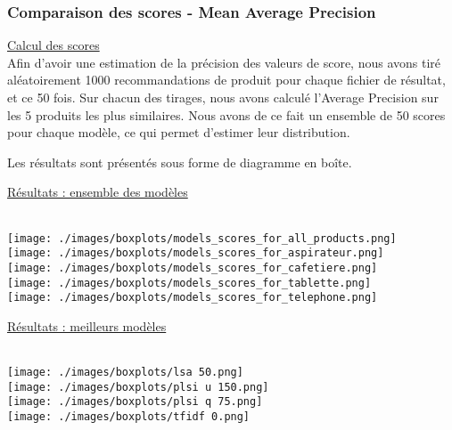 

\subsubsection{Comparaison des scores - Mean Average Precision}

\underline{Calcul des scores}
\\ Afin d'avoir une estimation de la précision des valeurs de score, nous avons tiré aléatoirement 1000 recommandations de produit pour chaque fichier de résultat, et ce 50 fois. Sur chacun des tirages, nous avons calculé l'Average Precision sur les 5 produits les plus similaires. Nous avons de ce fait un ensemble de 50 scores pour chaque modèle, ce qui permet d'estimer leur distribution.

Les résultats sont présentés sous forme de diagramme en boîte.

\underline{Résultats : ensemble des modèles}

\\ \texttt{[image: ./images/boxplots/models\_scores\_for\_all\_products.png]}
\\ \texttt{[image: ./images/boxplots/models\_scores\_for\_aspirateur.png]}
\\ \texttt{[image: ./images/boxplots/models\_scores\_for\_cafetiere.png]}
\\ \texttt{[image: ./images/boxplots/models\_scores\_for\_tablette.png]}
\\ \texttt{[image: ./images/boxplots/models\_scores\_for\_telephone.png]}

\underline{Résultats : meilleurs modèles}

\\ \texttt{[image: ./images/boxplots/lsa 50.png]}
\\ \texttt{[image: ./images/boxplots/plsi u 150.png]}
\\ \texttt{[image: ./images/boxplots/plsi q 75.png]}
\\ \texttt{[image: ./images/boxplots/tfidf 0.png]}

